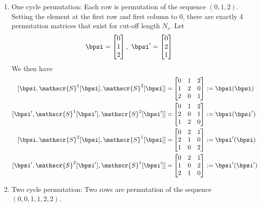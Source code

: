 \documentclass[11pt, oneside, dvipdfmx]{book}
\begin{document}
\begin{enumerate}
	\item One cycle permutation: Each row is permutation of the sequence $(0,1,2)$. Setting the element at the first row and first column to $0$, there are exactly 4 permutation matrices that exist for cut-off length $N_c$.
	Let
	\begin{equation*}
	\bpsi=\begin{bmatrix} 0\cr 1\cr 2\cr \end{bmatrix},~
	\bpsi'=\begin{bmatrix} 0\cr 2\cr 1\cr \end{bmatrix}
	\end{equation*}
We then have 
	\begin{equation}
	\begin{split}
	[\bpsi,\mathscr{S}^1[\bpsi],\mathscr{S}^2[\bpsi]]=
	&
	\begin{bmatrix}
	0 & 1 & 2\cr
	1 & 2 & 0\cr
	2 & 0 & 1
	\end{bmatrix}:=\bpsi(\bpsi) \\
	[\bpsi',\mathscr{S}^1[\bpsi'],\mathscr{S}^2[\bpsi']]=
	&
	\begin{bmatrix}
	0 & 1 & 2\cr
	2 & 0 & 1\cr
	1 & 2 & 0
	\end{bmatrix}:=\bpsi(\bpsi')\\
	[\bpsi,\mathscr{S}^2[\bpsi],\mathscr{S}^1[\bpsi]]=
	&
	\begin{bmatrix}
	0 & 2 & 1\cr
	2 & 1 & 0\cr
	1 & 0 & 2
	\end{bmatrix}:=\bpsi'(\bpsi)\\
	[\bpsi',\mathscr{S}^2[\bpsi'],\mathscr{S}^1[\bpsi']]=
	&
	\begin{bmatrix}
	0 & 2 & 1\cr
	1 & 0 & 2\cr
	2 & 1 & 0
	\end{bmatrix}:=\bpsi'(\bpsi')\\
	\end{split}
	\end{equation}
	
	
	\item Two cycle permutation: Two rows are permutation of the sequence $(0,0,1,1,2,2)$.
	

\end{enumerate}
\end{document}

